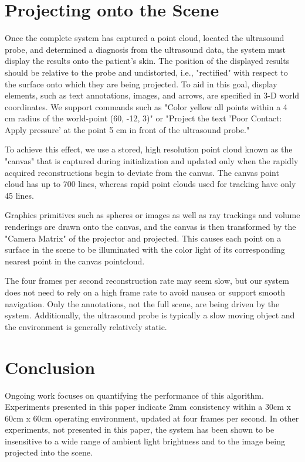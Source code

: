 \documentclass{llncs}
\begin{document}
\section{Projecting onto the Scene}

Once the complete system has captured a point cloud, located the ultrasound probe, and determined a diagnosis from the ultrasound data, the system must display the results onto the patient's skin. The position of the displayed results should be relative to the probe and undistorted, i.e., "rectified" with respect to the surface onto which they are being projected. To aid in this goal, display elements, such as text annotations, images, and arrows, are specified in 3-D world coordinates. We support commands such as "Color yellow all points within a 4 cm radius of the world-point (60, -12, 3)" or "Project the text 'Poor Contact: Apply pressure' at the point 5 cm in front of the ultrasound probe."

To achieve this effect, we use a stored, high resolution point cloud known as the "canvas" that is captured during initialization and updated only when the rapidly acquired reconstructions begin to deviate from the canvas. The canvas point cloud has up to 700 lines, whereas rapid point clouds used for tracking have only 45 lines. 

Graphics primitives such as spheres or images as well as ray trackings and volume renderings are drawn onto the canvas, and the canvas is then transformed by the "Camera Matrix" of the projector and projected. This causes each point on a surface in the scene to be illuminated with the color light of its corresponding nearest point in the canvas pointcloud. 

The four frames per second reconstruction rate may seem slow, but our system does not need to rely on a high frame rate to avoid nausea or support smooth navigation. Only the annotations, not the full scene, are being driven by the system. Additionally, the ultrasound probe is typically a slow moving object and the environment is generally relatively static.

\section{Conclusion}
Ongoing work focuses on quantifying the performance of this algorithm.  Experiments presented in this paper indicate 2mm consistency within a 30cm x 60cm x 60cm operating environment, updated at four frames per second.  In other experiments, not presented in this paper, the system has been shown to be insensitive to a wide range of ambient light brightness and to the image being projected into the scene.
\end{document}
